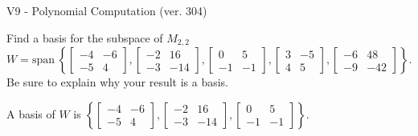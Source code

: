 \begin{exercise}
  \begin{exerciseTitle}V9 - Polynomial Computation (ver. 304)\end{exerciseTitle}
  \begin{exerciseStatement}
    Find a basis for the subspace of \(M_{2,2}\) 
\[W=\mathrm{span}\ \left\{\left[\begin{array}{cc}
-4 & -6 \\
-5 & 4
\end{array}\right] , \left[\begin{array}{cc}
-2 & 16 \\
-3 & -14
\end{array}\right] , \left[\begin{array}{cc}
0 & 5 \\
-1 & -1
\end{array}\right] , \left[\begin{array}{cc}
3 & -5 \\
4 & 5
\end{array}\right] , \left[\begin{array}{cc}
-6 & 48 \\
-9 & -42
\end{array}\right]\right\}.\]
 Be sure to explain why your result is a basis.


  \end{exerciseStatement}
  \begin{exerciseAnswer}
   A basis of \(W\) is  \(\left\{\left[\begin{array}{cc}
-4 & -6 \\
-5 & 4
\end{array}\right] , \left[\begin{array}{cc}
-2 & 16 \\
-3 & -14
\end{array}\right] , \left[\begin{array}{cc}
0 & 5 \\
-1 & -1
\end{array}\right]\right\}\).
  


  \end{exerciseAnswer}
\end{exercise}